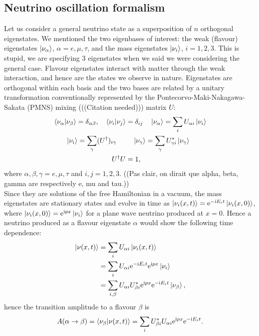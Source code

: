 \documentclass[10pt, a4paper]{article}
\newcommand{\me}{\mathrm{e}}
\newcommand{\mi}{\mathrm{i}}
\begin{document}
\subsection{Neutrino oscillation formalism} 
Let us consider a general neutrino state as a superposition of $n$ orthogonal
eigenstates. We mentioned the two eigenbases of interest: the weak (flavour)
eigenstates $\ket{\nu_{\alpha}}$, $\alpha=e, \mu, \tau$, and the mass
eigenstates $\ket{\nu_i}$, $i=1, 2, 3$. 
This is stupid, we are specifying 3 eigenstates when we said we were
considering the general case.
Flavour eigenstates interact with
matter through the weak interaction, and hence are the states we observe in
nature.  Eigenstates are orthogonal within each basis and the two bases are
related by a unitary transformation conventionally represented by the
Pontecorvo-Maki-Nakagawa-Sakata (PMNS) mixing (((Citation needed)))
matrix $U$: 
\begin{align*}
\bra{\nu_\alpha}\ket{\nu_\beta} = \delta_{\alpha \beta}, \quad
	\bra{\nu_i}\ket{\nu_j} &= \delta_{ij}  \quad
\ket{\nu_\alpha} = \sum_i U_{\alpha i} \ket{\nu_i}\\
	\ket{\nu_i} = \sum_\gamma (U^\dagger)_{i \gamma}~\quad &\quad \ket{\nu_\gamma} = \sum_\gamma
	U^*_{\gamma i} \ket{\nu_\gamma} \\U^\dagger U &= 1,
\end{align*}
where $\alpha, \beta, \gamma = e, \mu, \tau$ and $i, j = 1, 2, 3$. ((Pas clair,
on dirait que alpha, beta, gamma are respectively e, mu and tau.))\\
Since they are solutions of the free Hamiltonian in a vacuum, the mass eigenstates are stationary states and evolve in time as $\ket{\nu_i(x,
t)} = \me^{-\mi E_i t} \ket{\nu_i(x, 0)}$, where $\ket{\nu_i(x, 0)} = \me^{\mi p
x} \ket{\nu_i}$ for a plane wave neutrino produced at $x=0$.
Hence a neutrino produced as a flavour eigenstate $\alpha$ would show the
following time dependence:
\begin{align*}
\ket{\nu(x, t)} &= \sum_i U_{\alpha i} \ket{\nu_i(x, t)} \\
		&= \sum_i U_{\alpha i} \me^{-\mi E_i t} \me^{\mi p x} \ket{\nu_i}\\
		&= \sum_{i, \beta} U_{\alpha i} U^*_{\beta i} \me^{\mi p x}
				\me^{-\mi E_i t} \ket{\nu_\beta},
\end{align*}
hence the transition amplitude to a flavour $\beta$ is 
\begin{align}
A(\alpha \rightarrow \beta) = \bra{\nu_\beta}\ket{\nu(x, t)} \nonumber
			= \sum_i U^*_{\beta i} U_{\alpha i} \me^{\mi p x}
			\me^{-\mi E_i t}.
\end{align}
\end{document}
